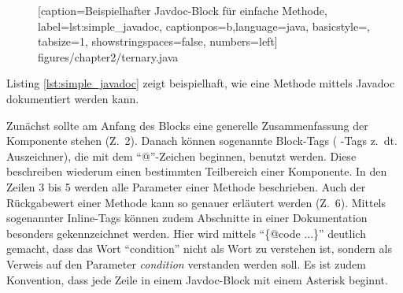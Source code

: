 		\begin{figure}[ht!]
			
			[caption={Beispielhafter Javdoc-Block für einfache Methode},
			label={lst:simple_javadoc},
			captionpos=b,language=java, basicstyle=\footnotesize, tabsize=1, showstringspaces=false,  numbers=left]
			{figures/chapter2/ternary.java}
		\end{figure}

Listing \ref{lst:simple_javadoc} zeigt beispielhaft, wie eine Methode mittels Javadoc dokumentiert werden kann.

Zunächst sollte am Anfang des Blocks eine generelle Zusammenfassung der Komponente stehen  (Z.~2). Danach können sogenannte Block-Tags ( -Tags z.~dt. Auszeichner), die mit dem \enquote{@}-Zeichen beginnen, benutzt werden. Diese beschreiben wiederum einen bestimmten Teilbereich einer Komponente. In den Zeilen 3 bis 5 werden alle Parameter einer Methode beschrieben. Auch der Rückgabewert einer Methode kann so genauer erläutert werden (Z.~6). Mittels sogenannter Inline-Tags können zudem Abschnitte in einer Dokumentation besonders gekennzeichnet werden. Hier wird mittels \enquote{\{@code ...\}} deutlich gemacht, dass das Wort \enquote{condition} nicht als Wort zu verstehen ist, sondern als Verweis auf den Parameter \textit{condition} verstanden werden soll. Es ist zudem Konvention, dass jede Zeile in einem Javdoc-Block mit einem Asterisk beginnt. 

